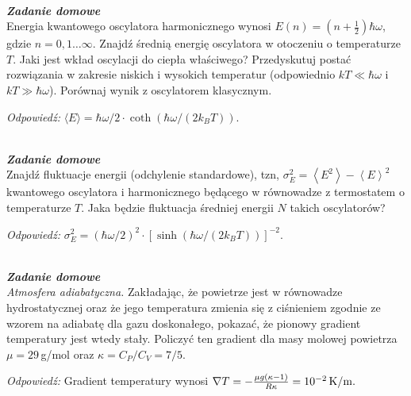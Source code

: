 \documentclass[11pt,a4paper]{article}
\newcounter{zaddom}\newcommand{\zaddom}[1][]{\addtocounter{zaddom}{1} ~\\  {\bf \emph{Zadanie domowe \arabic{zaddom} #1 }} \\}
\begin{document}
\vspace{2cm}

%
%
\zaddom
Energia kwantowego oscylatora harmonicznego wynosi $E(n)=(n+\frac{1}{2})\hbar\omega$,
gdzie $n = 0,1\ldots\infty$.
Znajdź średnią energię oscylatora w otoczeniu o temperaturze $T$.
Jaki jest wkład oscylacji do ciepła właściwego?
Przedyskutuj postać rozwiązania w zakresie niskich i wysokich
temperatur (odpowiednio $k T \ll \hbar\omega$ i $k T \gg \hbar\omega$).
Porównaj wynik z oscylatorem klasycznym.

\emph{Odpowiedź:} $\langle E \rangle =  \hbar \omega/2 \cdot  \coth(\hbar \omega / (2k_B T))$. 

\zaddom
Znajdź fluktuacje energii (odchylenie standardowe), tzn,
$\sigma_E^2= \left<E^2\right> - \left<E\right>^2 $ kwantowego oscylatora i
harmonicznego będącego w równowadze z termostatem o temperaturze $T$.
Jaka będzie fluktuacja średniej energii $N$ takich oscylatorów?

\emph{Odpowiedź:} $\sigma_E^2 =  (\hbar \omega/2)^2 \cdot [\sinh(\hbar \omega / (2k_B T))]^{-2}$.





\zaddom
{\em Atmosfera adiabatyczna.} Zakładając, że powietrze jest w równowadze hydrostatycznej
oraz że jego temperatura zmienia się z ciśnieniem zgodnie ze wzorem na adiabatę dla gazu
doskonałego, pokazać, że pionowy gradient temperatury jest wtedy stały.
Policzyć ten gradient dla masy molowej powietrza $\mu=29\,$g/mol oraz
$\kappa = C_P/C_V = 7/5$.

\emph{Odpowiedź:}
Gradient temperatury wynosi $\nabla T  = -\frac{\mu g (\kappa-1)}{R\kappa } = 10^{-2}\, {\rm K}/{\rm m}. $ 

\end{document}
